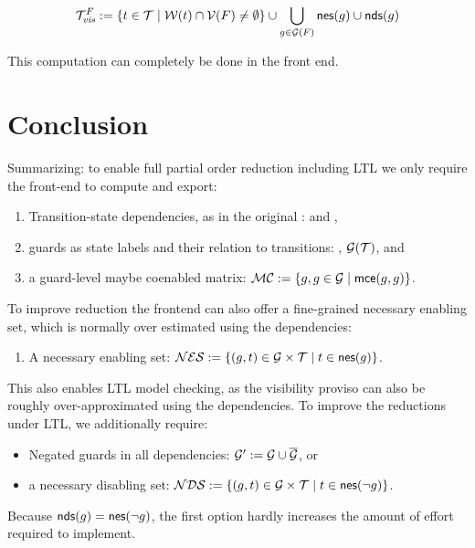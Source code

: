 \documentclass{paper}
\begin{document}
\[
\mathcal{T}^F_\mathit{vis}:=
\{ t\in\mathcal{T}\mid\mathcal{W}(t)\cap\mathcal{V}(F)\neq\emptyset \}
\cup
\bigcup_{g\in\mathcal{G}(F)} \textsf{nes}(g)\cup\textsf{nds}(g)
\]

This computation can completely be done in the front end.

\section{Conclusion}

Summarizing: to enable full partial order reduction including LTL
we only require the front-end to compute and export:
\begin{enumerate}
\item Transition-state dependencies, as in the 
original \pins: \writeset and \readset,
\item guards as \pins state labels and their relation to transitions: 
	\guards, $\mathcal{G}(\mathcal{T})$, and
\item a guard-level maybe coenabled matrix:
	$\mathcal{MC} := \{ g,g\in\mathcal{G} \mid  \textsf{mce}(g,g)\}$.
\end{enumerate}

To improve reduction the frontend can also offer a fine-grained necessary 
enabling set, which is normally over estimated using the dependencies:
\begin{enumerate}
\item A necessary enabling set:
	$\mathcal{NES} := \{ (g,t)\in\mathcal{G}\times\mathcal{T} \mid t\in\textsf{nes}(g)\}$.
\end{enumerate}

This also enables LTL model checking, as the visibility proviso can also
be roughly over-approximated using the dependencies. To improve the
reductions under LTL, we additionally require:
\begin{itemize}
\item Negated guards in all dependencies: $\mathcal{G}':=\mathcal{G}\cup\overline{\mathcal{G}}$,
	or
\item a necessary disabling set: 
	$\mathcal{NDS} := \{ (g,t)\in\mathcal{G}\times\mathcal{T} \mid t\in\textsf{nes}(\neg g)\}$.
\end{itemize}
Because $\textsf{nds}(g) = \textsf{nes}(\neg g)$, the first option hardly increases the
amount of effort required to implement.



\end{document}

